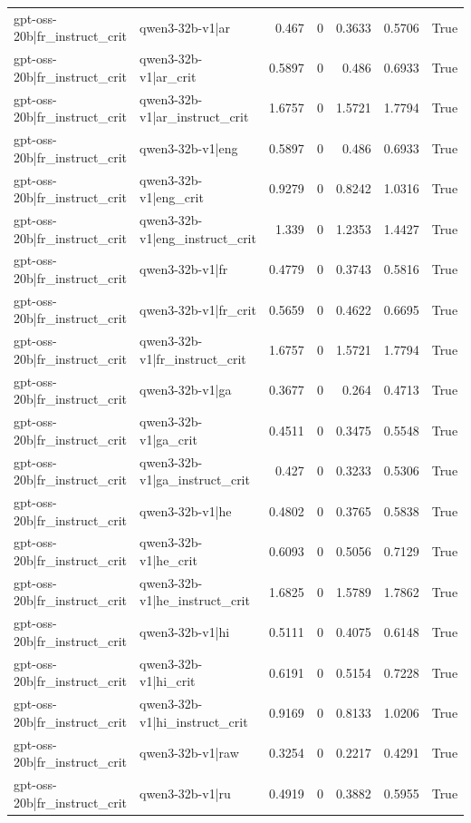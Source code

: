 \begin{table}
\begin{tabular}{l l r r r r l}
gpt-oss-20b|fr_instruct_crit & qwen3-32b-v1|ar & 0.467 & 0 & 0.3633 & 0.5706 & True \\
gpt-oss-20b|fr_instruct_crit & qwen3-32b-v1|ar_crit & 0.5897 & 0 & 0.486 & 0.6933 & True \\
gpt-oss-20b|fr_instruct_crit & qwen3-32b-v1|ar_instruct_crit & 1.6757 & 0 & 1.5721 & 1.7794 & True \\
gpt-oss-20b|fr_instruct_crit & qwen3-32b-v1|eng & 0.5897 & 0 & 0.486 & 0.6933 & True \\
gpt-oss-20b|fr_instruct_crit & qwen3-32b-v1|eng_crit & 0.9279 & 0 & 0.8242 & 1.0316 & True \\
gpt-oss-20b|fr_instruct_crit & qwen3-32b-v1|eng_instruct_crit & 1.339 & 0 & 1.2353 & 1.4427 & True \\
gpt-oss-20b|fr_instruct_crit & qwen3-32b-v1|fr & 0.4779 & 0 & 0.3743 & 0.5816 & True \\
gpt-oss-20b|fr_instruct_crit & qwen3-32b-v1|fr_crit & 0.5659 & 0 & 0.4622 & 0.6695 & True \\
gpt-oss-20b|fr_instruct_crit & qwen3-32b-v1|fr_instruct_crit & 1.6757 & 0 & 1.5721 & 1.7794 & True \\
gpt-oss-20b|fr_instruct_crit & qwen3-32b-v1|ga & 0.3677 & 0 & 0.264 & 0.4713 & True \\
gpt-oss-20b|fr_instruct_crit & qwen3-32b-v1|ga_crit & 0.4511 & 0 & 0.3475 & 0.5548 & True \\
gpt-oss-20b|fr_instruct_crit & qwen3-32b-v1|ga_instruct_crit & 0.427 & 0 & 0.3233 & 0.5306 & True \\
gpt-oss-20b|fr_instruct_crit & qwen3-32b-v1|he & 0.4802 & 0 & 0.3765 & 0.5838 & True \\
gpt-oss-20b|fr_instruct_crit & qwen3-32b-v1|he_crit & 0.6093 & 0 & 0.5056 & 0.7129 & True \\
gpt-oss-20b|fr_instruct_crit & qwen3-32b-v1|he_instruct_crit & 1.6825 & 0 & 1.5789 & 1.7862 & True \\
gpt-oss-20b|fr_instruct_crit & qwen3-32b-v1|hi & 0.5111 & 0 & 0.4075 & 0.6148 & True \\
gpt-oss-20b|fr_instruct_crit & qwen3-32b-v1|hi_crit & 0.6191 & 0 & 0.5154 & 0.7228 & True \\
gpt-oss-20b|fr_instruct_crit & qwen3-32b-v1|hi_instruct_crit & 0.9169 & 0 & 0.8133 & 1.0206 & True \\
gpt-oss-20b|fr_instruct_crit & qwen3-32b-v1|raw & 0.3254 & 0 & 0.2217 & 0.4291 & True \\
gpt-oss-20b|fr_instruct_crit & qwen3-32b-v1|ru & 0.4919 & 0 & 0.3882 & 0.5955 & True \\

\end{tabular}
\end{table}
